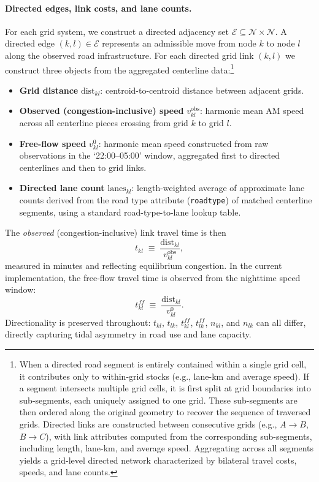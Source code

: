 \documentclass[12pt]{article}
\begin{document}
	\paragraph{Directed edges, link costs, and lane counts.}
	For each grid system, we construct a directed adjacency set $\mathcal E\subseteq\mathcal N\times\mathcal N$. A directed edge $(k,l)\in\mathcal E$ represents an admissible move from node $k$ to node $l$ along the observed road infrastructure. For each directed grid link $(k,l)$ we construct three objects from the aggregated centerline data:\footnote{When a directed road segment is entirely contained within a single grid cell, it contributes only to within-grid stocks (e.g., lane-km and average speed). If a segment intersects multiple grid cells, it is first split at grid boundaries into sub-segments, each uniquely assigned to one grid. These sub-segments are then ordered along the original geometry to recover the sequence of traversed grids. Directed links are constructed between consecutive grids (e.g., $A \to B$, $B \to C$), with link attributes computed from the corresponding sub-segments, including length, lane-km, and average speed. Aggregating across all segments yields a grid-level directed network characterized by bilateral travel costs, speeds, and lane counts.}
	\begin{itemize}
		\item \textbf{Grid distance} $\text{dist}_{kl}$: centroid-to-centroid distance between adjacent grids.
		\item \textbf{Observed (congestion-inclusive) speed} $v_{kl}^{\text{obs}}$: harmonic mean AM speed across all centerline pieces crossing from grid $k$ to grid $l$.
		\item \textbf{Free-flow speed} $v_{kl}^{0}$: harmonic mean speed constructed from raw observations in the `22:00--05:00' window, aggregated first to directed centerlines and then to grid links.
		\item \textbf{Directed lane count} $\text{lanes}_{kl}$: length-weighted average of approximate lane counts derived from the road type attribute (\texttt{roadtype}) of matched centerline segments, using a standard road-type-to-lane lookup table.
	\end{itemize}
	The \emph{observed} (congestion-inclusive) link travel time is then
	\begin{equation}\label{eq:data_tkl}
		t_{kl}\;\equiv\; \frac{\text{dist}_{kl}}{v_{kl}^{\text{obs}}},
	\end{equation}
	measured in minutes and reflecting equilibrium congestion. In the current implementation, the free-flow travel time is observed from the nighttime speed window:
	\begin{equation}
		t_{kl}^{ff}\;\equiv\; \frac{\text{dist}_{kl}}{v_{kl}^{0}}.
	\end{equation}
	Directionality is preserved throughout: $t_{kl}$, $t_{lk}$, $t_{kl}^{ff}$, $t_{lk}^{ff}$, $n_{kl}$, and $n_{lk}$ can all differ, directly capturing tidal asymmetry in road use and lane capacity.
	
\end{document}
